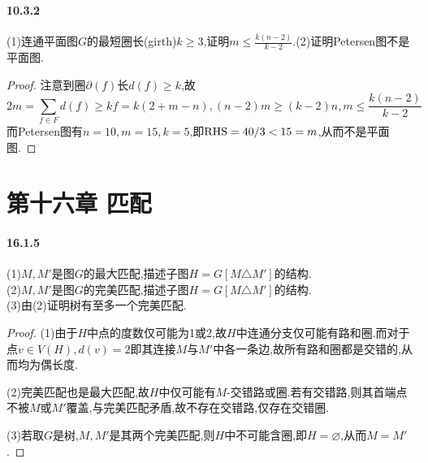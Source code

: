 \documentclass[11pt]{article}
\begin{document}
\paragraph{10.3.2}(1)连通平面图$G$的最短圈长(girth)$k\geq 3$,证明$m\leq \frac{k(n-2)}{k-2}$.(2)证明Petersen图不是平面图.
\begin{proof}
    注意到圈$\partial(f)$长$d(f)\geq k$,故
    $$2m=\sum_{f\in F}d(f)\geq kf=k(2+m-n), (n-2)m\geq (k-2)n, m\leq \frac{k(n-2)}{k-2}$$
    而Petersen图有$n=10,m=15,k=5$,即$\operatorname{RHS}=40/3<15=m$,从而不是平面图.
\end{proof}

\section{第十六章\; 匹配}
\paragraph{16.1.5}(1)$M,M'$是图$G$的最大匹配,描述子图$H=G[M\triangle M']$的结构.\\
(2)$M,M'$是图$G$的完美匹配,描述子图$H=G[M\triangle M']$的结构.\\
(3)由(2)证明树有至多一个完美匹配.
\begin{proof}
    (1)由于$H$中点的度数仅可能为1或2,故$H$中连通分支仅可能有路和圈.而对于点$v\in V(H), d(v)=2$即其连接$M$与$M'$中各一条边,故所有路和圈都是交错的,从而均为偶长度.

    (2)完美匹配也是最大匹配,故$H$中仅可能有$M$-交错路或圈.若有交错路,则其首端点不被$M$或$M'$覆盖,与完美匹配矛盾,故不存在交错路,仅存在交错圈.

    (3)若取$G$是树,$M,M'$是其两个完美匹配,则$H$中不可能含圈,即$H=\varnothing$,从而$M=M'$.
\end{proof}
\end{document}
